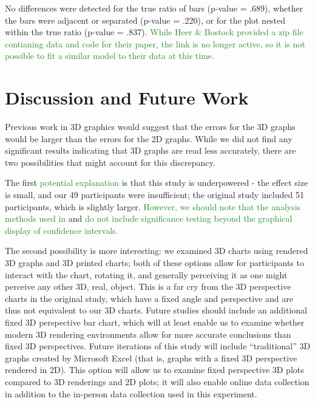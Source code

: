 \documentclass[letterpaper,inpress,dvipsnames]{jdsart}
\begin{document}
No differences were detected for the true ratio of bars (p-value = .689), whether the bars were adjacent or separated (p-value = .220), or for the plot nested within the true ratio (p-value = .837).
{\textcolor{ForestGreen}{While Heer \& Bostock provided a zip file contianing data and code for their paper, the link is no longer active, so it is not possible to fit a similar model to their data at this time.}}

\hypertarget{discussion-and-future-work}{%
\section{Discussion and Future Work}\label{discussion-and-future-work}}

Previous work in 3D graphics would suggest that the errors for the 3D graphs would be larger than the errors for the 2D graphs.
While we did not find any significant results indicating that 3D graphs are read less accurately, there are two possibilities that might account for this discrepancy.

The first {\textcolor{ForestGreen}{potential explanation}} is that this study is underpowered - the effect size is small, and our 49 participants were insufficient; the original study included 51 participants, which is slightly larger. {\textcolor{ForestGreen}{However, we should note that the analysis methods used in}} \citet{heerCrowdsourcingGraphicalPerception2010b} and \citet{cleveland_graphical_1984} {\textcolor{ForestGreen}{do not include significance testing beyond the graphical display of confidence intervals.}}

The second possibility is more interesting: we examined 3D charts using rendered 3D graphs and 3D printed charts; both of these options allow for participants to interact with the chart, rotating it, and generally perceiving it as one might perceive any other 3D, real, object.
This is a far cry from the 3D perspective charts in the original study, which have a fixed angle and perspective and are thus not equivalent to our 3D charts.
Future studies should include an additional fixed 3D perspective bar chart, which will at least enable us to examine whether modern 3D rendering environments allow for more accurate conclusions than fixed 3D perspectives. Future iterations of this study will include ``traditional'' 3D graphs created by Microsoft Excel (that is, graphs with a fixed 3D perspective rendered in 2D). This option will allow us to examine fixed perspective 3D plots compared to 3D renderings and 2D plots; it will also enable online data collection in addition to the in-person data collection used in this experiment.
\end{document}
